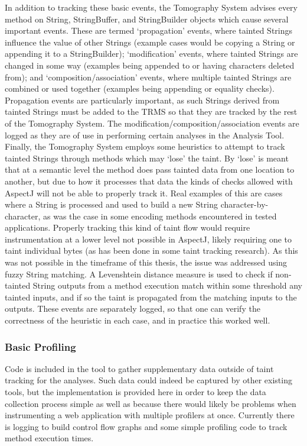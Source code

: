 \documentclass[msc,oneside]{ubcthesis}
\begin{document}
In addition to tracking these basic events, the Tomography System advises every method on String, StringBuffer, and StringBuilder objects which cause several important events. These are termed `propagation' events, where tainted Strings influence the value of other Strings (example cases would be copying a String or appending it to a StringBuilder); `modification' events, where tainted Strings are changed in some way (examples being appended to or having characters deleted from); and `composition/association' events, where multiple tainted Strings are combined or used together (examples being appending or equality checks). Propagation events are particularly important, as such Strings derived from tainted Strings must be added to the TRMS so that they are tracked by the rest of the Tomography System. The modification/composition/association events are logged as they are of use in performing certain analyses in the Analysis Tool.\\

Finally, the Tomography System employs some heuristics to attempt to track tainted Strings through methods which may `lose' the taint. By `lose' is meant that at a semantic level the method does pass tainted data from one location to another, but due to how it processes that data the kinds of checks allowed with AspectJ will not be able to properly track it. Real examples of this are cases where a String is processed and used to build a new String character-by-character, as was the case in some encoding methods encountered in tested applications. Properly tracking this kind of taint flow would require instrumentation at a lower level not possible in AspectJ, likely requiring one to taint individual bytes (as has been done in some taint tracking research). As this was not possible in the timeframe of this thesis, the issue was addressed using fuzzy String matching. A Levenshtein distance measure is used to check if non-tainted String outputs from a method execution match within some threshold any tainted inputs, and if so the taint is propagated from the matching inputs to the outputs. These events are separately logged, so that one can verify the correctness of the heuristic in each case, and in practice this worked well.

\subsubsection{Basic Profiling}
Code is included in the tool to gather supplementary data outside of taint tracking for the analyses. Such data could indeed be captured by other existing tools, but the implementation is provided here in order to keep the data collection process simple as well as because there would likely be problems when instrumenting a web application with multiple profilers at once. Currently there is logging to build control flow graphs and some simple profiling code to track method execution times.
\end{document}
